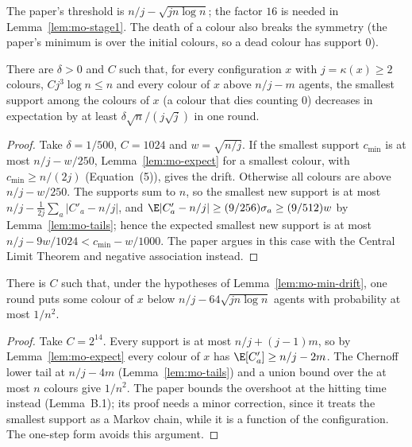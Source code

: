 The paper's threshold is $n/j-\sqrt{jn\log n}$; the factor $16$ is needed in
Lemma~\ref{lem:mo-stage1}. The death of a colour also breaks the symmetry (the paper's minimum
is over the initial colours, so a dead colour has support $0$).

\begin{lemma}[Equation~(3)]\label{lem:mo-min-drift}
\leanok
{}
There are $\delta>0$ and $C$ such that, for every configuration $x$ with $j=\kappa(x)\ge2$
colours, $Cj^3\log n\le n$ and every colour of $x$ above $n/j-m$ agents, the smallest support
among the colours of $x$ (a colour that dies counting $0$) decreases in expectation by at least
$\delta\sqrt n/(j\sqrt j)$ in one round.
\end{lemma}
\begin{proof}\leanok
Take $\delta=1/500$, $C=1024$ and $w=\sqrt{n/j}$. If the smallest support $c_{\min}$ is at most
$n/j-w/250$, Lemma~\ref{lem:mo-expect} for a smallest colour, with $c_{\min}\ge n/(2j)$
(Equation~(5)), gives the drift. Otherwise all colours are above $n/j-w/250$. The supports sum to
$n$, so the smallest new support is at most $n/j-\frac1{2j}\sum_a|C'_a-n/j|$, and
$\E|C'_a-n/j|\ge(9/256)\sigma_a\ge(9/512)w$ by Lemma~\ref{lem:mo-tails}; hence the expected
smallest new support is at most $n/j-9w/1024<c_{\min}-w/1000$. The paper argues in this case with
the Central Limit Theorem and negative association instead.
\end{proof}

\begin{lemma}\label{lem:mo-overshoot}
\leanok
{}
There is $C$ such that, under the hypotheses of Lemma~\ref{lem:mo-min-drift}, one round puts some
colour of $x$ below $n/j-64\sqrt{jn\log n}$ agents with probability at most $1/n^2$.
\end{lemma}
\begin{proof}\leanok
Take $C=2^{14}$. Every support is at most $n/j+(j-1)m$, so by Lemma~\ref{lem:mo-expect} every
colour of $x$ has $\E[C'_a]\ge n/j-2m$. The Chernoff lower tail at $n/j-4m$
(Lemma~\ref{lem:mo-tails}) and a union bound over the at most $n$ colours give $1/n^2$. The paper
bounds the overshoot at the hitting time instead (Lemma~B.1); its proof needs a minor correction,
since it treats the smallest support as a Markov chain, while it is a function of the
configuration. The one-step form avoids this argument.
\end{proof}

